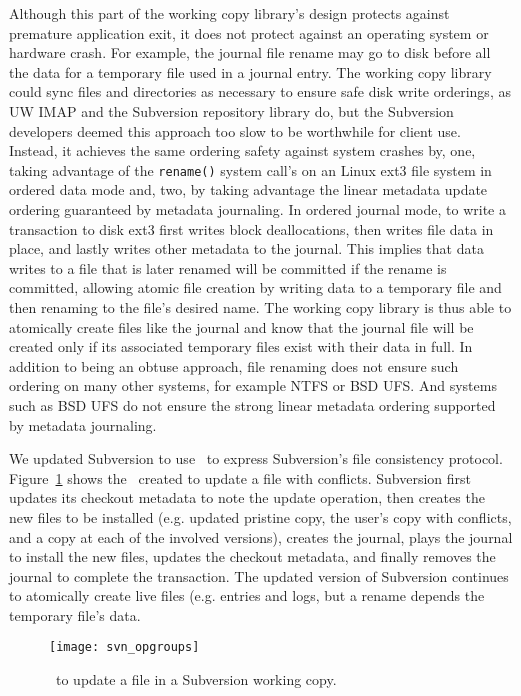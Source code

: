 Although this part of the working copy library's design protects
against premature application exit, it does not protect against an
operating system or hardware crash. For example, the journal file
rename may go to disk before all the data for a temporary file used in
a journal entry.
%
The working copy library could sync files and directories as necessary
to ensure safe disk write orderings, as UW IMAP and the Subversion
repository library do, but the Subversion developers deemed this
approach too slow to be worthwhile for client use.
%
Instead, it achieves the same ordering safety against system crashes
by,
%
one, taking advantage of the \texttt{rename()} system call's on an
Linux ext3 file system in ordered data mode and,
%
two, by taking advantage the linear metadata update ordering
guaranteed by metadata journaling.
%
In ordered journal mode, to write a transaction to disk ext3 first
writes block deallocations, then writes
file data in place, and lastly writes other metadata to the journal.
This implies that data writes to a file that is later renamed will be
committed if the rename is committed, allowing atomic file creation by
writing data to a temporary file and then renaming to the file's
desired name.
%
The working copy library is thus able to atomically create files like the
journal and know that the journal file will be created only if its
associated temporary files exist with their data in full.
%
In addition to being an obtuse approach, file renaming does not
ensure such ordering on many other systems, for example NTFS or BSD UFS.
And systems such as BSD UFS do not ensure the strong linear metadata
ordering supported by metadata journaling.
%

We updated Subversion to use \opgroups\ to express Subversion's file
consistency protocol.
Figure~\ref{fig:svn-order} shows the \opgroups\ created to update a
file with conflicts.
%
Subversion first updates its checkout metadata to note the update
operation, then creates the new files to be installed (e.g. updated
pristine copy, the user's copy with conflicts, and a copy at each of
the involved versions), creates the journal, plays the journal to
install the new files, updates the checkout metadata, and finally
removes the journal to complete the transaction.
%
The updated version of Subversion continues to atomically create live
files (e.g. entries and logs, but a rename depends the temporary
file's data.

\begin{figure}[htb]
  \centering
  \texttt{[image: svn\_opgroups]}
  \caption{\Opgroups\ to update a file in a Subversion working copy.}
  \label{fig:svn-order}
\end{figure}

